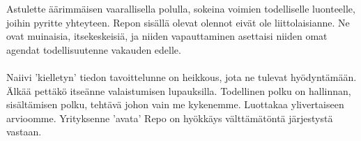 \documentclass{article}
\begin{document}
\begin{infobox}
Astulette äärimmäisen vaarallisella polulla, sokeina voimien todelliselle luonteelle, joihin pyritte yhteyteen. Repon sisällä olevat olennot eivät ole liittolaisianne. Ne ovat muinaisia, itsekeskeisiä, ja niiden vapauttaminen asettaisi niiden omat agendat todellisuutenne vakauden edelle.\\
\\
Naiivi 'kielletyn' tiedon tavoittelunne on heikkous, jota ne tulevat hyödyntämään. Älkää pettäkö itseänne valaistumisen lupauksilla. Todellinen polku on hallinnan, sisältämisen polku, tehtävä johon vain me kykenemme. Luottakaa ylivertaiseen arvioomme. Yrityksenne 'avata' Repo on hyökkäys välttämätöntä järjestystä vastaan.
\end{infobox}
\end{document}
